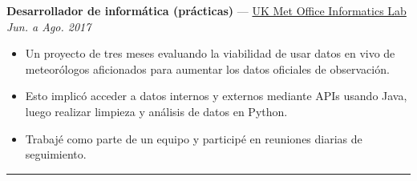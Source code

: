 \documentclass[10pt]{article}
\newenvironment{innerlist}[1][\enskip\textbullet]{
	\begin{itemize}[#1,leftmargin=*,parsep=0pt,itemsep=1pt,topsep=2pt,partopsep=0pt]
}{\end{itemize}}
\begin{document}
\textbf{Desarrollador de informática (prácticas)} — \href{https://www.metoffice.gov.uk/research/foundation/informatics-lab/what-we-do}{UK Met Office Informatics Lab} \hfill \emph{Jun. a Ago. 2017} \\
\vspace{-6pt}
\begin{innerlist}
	\item Un proyecto de tres meses evaluando la viabilidad de usar datos en vivo de
		meteorólogos aficionados para aumentar los datos oficiales de observación.
	\item Esto implicó acceder a datos internos y externos mediante APIs usando Java,
		luego realizar limpieza y análisis de datos en Python.
	\item Trabajé como parte de un equipo y participé en reuniones diarias de seguimiento.
\end{innerlist}







\vspace{1pt}
\begin{center}
		\rule{0.5\columnwidth}{1pt}
\end{center}
\vspace{-10pt}
\end{document}
